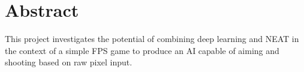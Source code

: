 \section{Abstract}
This project investigates the potential of combining deep learning and NEAT in the context of a simple FPS game to produce an AI capable of aiming and shooting based on raw pixel input.